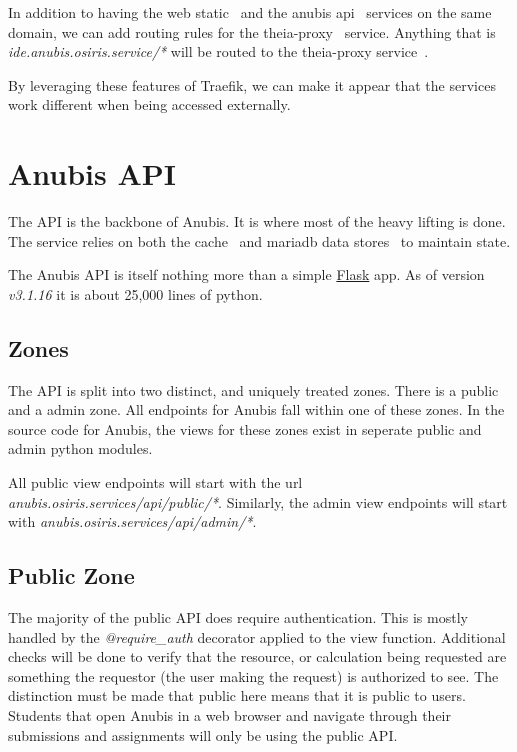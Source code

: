 In addition to having the web static~ and the anubis api~ services on
the same domain, we can add routing rules for the theia-proxy~ service.
Anything that is \textit{ide.anubis.osiris.service/*} will be routed to the theia-proxy service~.

By leveraging these features of Traefik, we can make it appear that 
the services work different when being accessed externally.

\section{Anubis API}\label{sec:api}

The API is the backbone of Anubis. 
It is where most of the heavy lifting is done. 
The service relies on both the cache~ and mariadb data 
stores~ to maintain state.

The Anubis API is itself nothing more than a simple \href{https://flask.palletsprojects.com/en/2.0.x/}{Flask} app.
As of version \textit{v3.1.16} it is about 25,000 lines of python.

\subsection{Zones}\label{sec:api-zones}

The API is split into two distinct, and uniquely treated zones. 
There is a public and a admin zone.
All endpoints for Anubis fall within one of these zones.
In the source code for Anubis, the views for these zones exist 
in seperate public and admin python modules.

All public view endpoints will start with the url \textit{anubis.osiris.services/api/public/*}.
Similarly, the admin view endpoints will start with \textit{anubis.osiris.services/api/admin/*}.

\subsection{Public Zone}\label{sec:api-public-zone}
The majority of the public API does require authentication.
This is mostly handled by the \textit{@require\_auth} decorator applied to the view function.
Additional checks will be done to verify that the resource, or calculation being requested are
something the requestor (the user making the request) is authorized to see. 
The distinction must be made that public here means that it is public to users.
Students that open Anubis in a web browser and navigate through their submissions and assignments
will only be using the public API.

